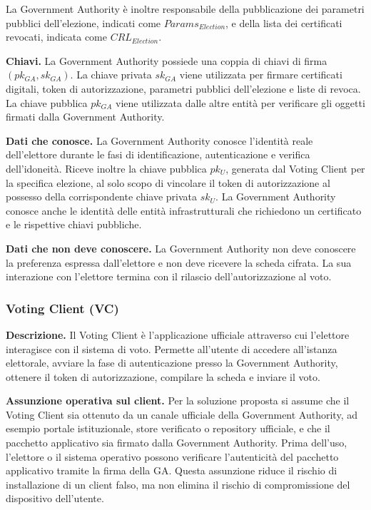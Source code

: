 \documentclass[a4paper,12pt]{article}
\begin{document}
La Government Authority \`e inoltre responsabile della pubblicazione dei parametri pubblici dell'elezione, indicati come \(Params_{Election}\), e della lista dei certificati revocati, indicata come \(CRL_{Election}\).

\textbf{Chiavi.}
La Government Authority possiede una coppia di chiavi di firma \((pk_{GA}, sk_{GA})\).
La chiave privata \(sk_{GA}\) viene utilizzata per firmare certificati digitali, token di autorizzazione, parametri pubblici dell'elezione e liste di revoca.
La chiave pubblica \(pk_{GA}\) viene utilizzata dalle altre entit\`a per verificare gli oggetti firmati dalla Government Authority.

\textbf{Dati che conosce.}
La Government Authority conosce l'identit\`a reale dell'elettore durante le fasi di identificazione, autenticazione e verifica dell'idoneit\`a.
Riceve inoltre la chiave pubblica \(pk_U\), generata dal Voting Client per la specifica elezione, al solo scopo di vincolare il token di autorizzazione al possesso della corrispondente chiave privata \(sk_U\).
La Government Authority conosce anche le identit\`a delle entit\`a infrastrutturali che richiedono un certificato e le rispettive chiavi pubbliche.

\textbf{Dati che non deve conoscere.}
La Government Authority non deve conoscere la preferenza espressa dall'elettore e non deve ricevere la scheda cifrata.
La sua interazione con l'elettore termina con il rilascio dell'autorizzazione al voto.

\subsubsection{Voting Client (VC)}

\textbf{Descrizione.}
Il Voting Client \`e l'applicazione ufficiale attraverso cui l'elettore interagisce con il sistema di voto.
Permette all'utente di accedere all'istanza elettorale, avviare la fase di autenticazione presso la Government Authority, ottenere il token di autorizzazione, compilare la scheda e inviare il voto.

\textbf{Assunzione operativa sul client.}
Per la soluzione proposta si assume che il Voting Client sia ottenuto da un canale ufficiale della Government Authority, ad esempio portale istituzionale, store verificato o repository ufficiale, e che il pacchetto applicativo sia firmato dalla Government Authority.
Prima dell'uso, l'elettore o il sistema operativo possono verificare l'autenticit\`a del pacchetto applicativo tramite la firma della GA.
Questa assunzione riduce il rischio di installazione di un client falso, ma non elimina il rischio di compromissione del dispositivo dell'utente.
\end{document}
